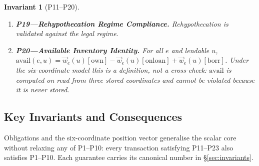 \documentclass[11pt,a4paper]{article}
\newtheorem{invariant}[definition]{Invariant}
\begin{document}
\begin{invariant}[P11--P20]
\begin{enumerate}
\item \textbf{P19---Rehypothecation Regime Compliance.} Rehypothecation is validated against the legal regime.
\item \textbf{P20---Available Inventory Identity.} For all $e$ and lendable $u$, $\mathrm{avail}(e,u) = \vec{w}_e(u)[\mathrm{own}] - \vec{w}_e(u)[\mathrm{onloan}] + \vec{w}_e(u)[\mathrm{borr}]$. Under the six-coordinate model this is a definition, not a cross-check: $\mathrm{avail}$ is computed on read from three stored coordinates and cannot be violated because it is never stored.
\end{enumerate}
\end{invariant}

\clearpage

\subsection*{Key Invariants and Consequences}

Obligations and the six-coordinate position vector generalise the scalar core without
relaxing any of P1--P10: every transaction satisfying P11--P23 also satisfies P1--P10. Each
guarantee carries its canonical number in \S\ref{sec:invariants}.
\end{document}
